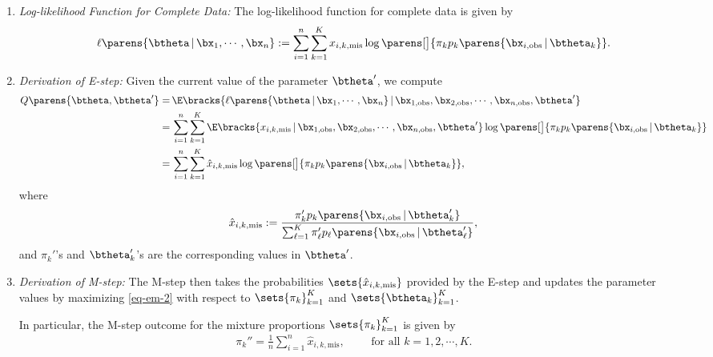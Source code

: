 \documentclass[12pt]{article}
\begin{document}
\begin{enumerate}[label=\textbf{\arabic*.}]
\begin{enumerate}
		\item \textit{Log-likelihood Function for Complete Data:} The log-likelihood function for complete data is given by 
		\begin{align}\label{eq-em-2}
			\ell \parens{\btheta \,\vert\, \bx_1, \cdots, \bx_n} := \sum_{i=1}^n \sum_{k=1}^K x_{i,k,\mathrm{mis}} \log \parens[\big]{\pi_k p_k \parens{\bx_{i, \mathrm{obs}} \,\vert\, \btheta_k}}. 
		\end{align}
		
		\item \textit{Derivation of E-step:} Given the current value of the parameter $\btheta'$, we compute 
		\begin{align*}
			Q \parens{\btheta, \btheta'} = & \, \E \bracks{\ell \parens{\btheta \,\vert\, \bx_1, \cdots, \bx_n} \,\vert\, \bx_{1, \mathrm{obs}}, \bx_{2, \mathrm{obs}}, \cdots, \bx_{n, \mathrm{obs}}, \btheta'} \\ 
			= & \, \sum_{i=1}^n \sum_{k=1}^K \E \bracks{x_{i,k,\mathrm{mis}} \,\vert\, \bx_{1, \mathrm{obs}}, \bx_{2, \mathrm{obs}}, \cdots, \bx_{n, \mathrm{obs}}, \btheta'} \log \parens[\big]{\pi_k p_k \parens{\bx_{i, \mathrm{obs}} \,\vert\, \btheta_k}} \\ 
			= & \, \sum_{i=1}^n \sum_{k=1}^K \hat{x}_{i,k,\mathrm{mis}} \log \parens[\big]{\pi_k p_k \parens{\bx_{i, \mathrm{obs}} \,\vert\, \btheta_k}}, 
		\end{align*}
		where 
		\begin{align*}
			\hat{x}_{i,k,\mathrm{mis}} := \frac{\pi_k' p_k \parens{\bx_{i, \mathrm{obs}} \,\vert\, \btheta_k'}}{\sum_{\ell=1}^K \pi_{\ell}' p_{\ell} \parens{\bx_{i, \mathrm{obs}} \,\vert\, \btheta_{\ell}'}}, 
		\end{align*}
		and $\pi_k'$'s and $\btheta_{k}'$'s are the corresponding values in $\btheta'$. 
		
		\item \textit{Derivation of M-step:} The M-step then takes the probabilities $\sets{\hat{x}_{i,k,\mathrm{mis}}}$ provided by the E-step and updates the parameter values by maximizing \eqref{eq-em-2} with respect to $\sets{\pi_k}_{k=1}^K$ and $\sets{\btheta_k}_{k=1}^K$. 
		
		In particular, the M-step outcome for the mixture proportions $\sets{\pi_k}_{k=1}^K$ is given by 
		\begin{align*}
			\pi_k'' = \frac{1}{n} \sum_{i=1}^n \hat{x}_{i,k,\mathrm{mis}}, \qquad \text{ for all } k = 1, 2, \cdots, K. 
		\end{align*}
		

\end{enumerate}
\end{enumerate}
\end{document}
